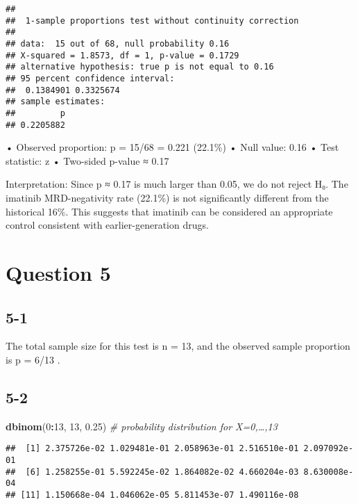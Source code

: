 \documentclass[
]{article}
\newenvironment{Shaded}{\begin{snugshade}}{\end{snugshade}}
\newcommand{\CommentTok}[1]{\textcolor[rgb]{0.56,0.35,0.01}{\textit{#1}}}
\newcommand{\DecValTok}[1]{\textcolor[rgb]{0.00,0.00,0.81}{#1}}
\newcommand{\FloatTok}[1]{\textcolor[rgb]{0.00,0.00,0.81}{#1}}
\newcommand{\FunctionTok}[1]{\textcolor[rgb]{0.13,0.29,0.53}{\textbf{#1}}}
\newcommand{\NormalTok}[1]{#1}
\newcommand{\SpecialCharTok}[1]{\textcolor[rgb]{0.81,0.36,0.00}{\textbf{#1}}}
\begin{document}
\begin{verbatim}
## 
##  1-sample proportions test without continuity correction
## 
## data:  15 out of 68, null probability 0.16
## X-squared = 1.8573, df = 1, p-value = 0.1729
## alternative hypothesis: true p is not equal to 0.16
## 95 percent confidence interval:
##  0.1384901 0.3325674
## sample estimates:
##         p 
## 0.2205882
\end{verbatim}

• Observed proportion: \hat p = 15/68 = 0.221 (22.1\%) • Null value:
0.16 • Test statistic: z  • Two-sided p-value ≈ 0.17

Interpretation: Since p ≈ 0.17 is much larger than 0.05, we do not
reject H₀. The imatinib MRD-negativity rate (22.1\%) is not
significantly different from the historical 16\%. This suggests that
imatinib can be considered an appropriate control consistent with
earlier-generation drugs.

\section{Question 5}\label{question-5}

\subsection{5-1}\label{section-8}

The total sample size for this test is n = 13, and the observed sample
proportion is \hat p = 6/13 .

\subsection{5-2}\label{section-9}

\begin{Shaded}
\begin{Highlighting}[]
\FunctionTok{dbinom}\NormalTok{(}\DecValTok{0}\SpecialCharTok{:}\DecValTok{13}\NormalTok{, }\DecValTok{13}\NormalTok{, }\FloatTok{0.25}\NormalTok{)           }\CommentTok{\# probability distribution for X=0,…,13}
\end{Highlighting}
\end{Shaded}

\begin{verbatim}
##  [1] 2.375726e-02 1.029481e-01 2.058963e-01 2.516510e-01 2.097092e-01
##  [6] 1.258255e-01 5.592245e-02 1.864082e-02 4.660204e-03 8.630008e-04
## [11] 1.150668e-04 1.046062e-05 5.811453e-07 1.490116e-08
\end{verbatim}
\end{document}
